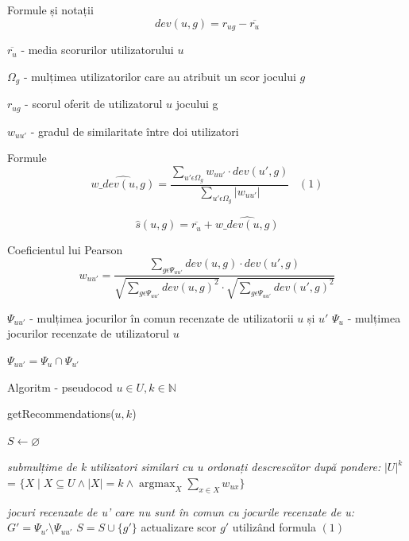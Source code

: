 \documentclass{beamer}
\DeclareMathOperator*{\argmax}{argmax}
\begin{document}
\begin{frame}{Formule și notații}
    \[ dev(u,g) = r_{ug} - \overline{r_{u}} \]
    
    \( \overline{r_{u}}\) - media scorurilor utilizatorului \( u \)
    
    \( \Omega_{g}\) - mulțimea utilizatorilor care au atribuit un scor jocului \( g \)
    
    \( r_{ug} \) - scorul oferit de utilizatorul \( u \) jocului g
    
    \( w_{uu'}\) - gradul de similaritate între doi utilizatori
    
\end{frame}

\begin{frame}{Formule}
    \[ \hat{w\_dev(u,g)} = \dfrac{ \sum\limits_{u' \epsilon \Omega_{g} } w_{uu'} \cdot dev(u', g) }{\sum\limits_{u' \epsilon \Omega_{g}} |w_{uu'}|} \;\;\; (1) \]
    
    \[  \hat{s}(u,g) = \overline{r_u} + \hat{w\_dev(u,g)} \]
\end{frame}

\begin{frame}{Coeficientul lui Pearson}
\[ w_{uu'} = \dfrac{ \sum\limits_{g \epsilon \Psi_{uu'} } dev(u, g) \cdot dev(u', g) }{
\sqrt{\sum\limits_{g \epsilon \Psi_{uu'} } dev(u, g)^2} \cdot \sqrt{\sum\limits_{g \epsilon \Psi_{uu'} } dev(u', g)^2} }\]

\( \Psi_{uu'}\) - mulțimea jocurilor în comun recenzate de utilizatorii \( u \) și \( u' \)
\( \Psi_{u}\) - mulțimea jocurilor recenzate de utilizatorul \( u \)

\( \Psi_{uu'} = \Psi_{u} \cap \Psi_{u'} \) 

    
\end{frame}

\begin{frame}[fragile]{Algoritm - pseudocod}
    \( u \in U, k \in \mathbb{N} \)
    
    getRecommendations(\(u, k \))
    \begin{algorithmic}
\State $S \gets \varnothing $

\State \textit{ submulțime de k utilizatori similari cu u ordonați descrescător după pondere:}
\State \( |U|^k \) = \( \{ X  \; | \; X \subseteq U \land |X| = k \land \argmax_{X} \sum_{x \in X} w_{ux}  \} \)

    \State \textit{jocuri recenzate de u' care nu sunt în comun cu jocurile recenzate de u:}
    \State \( G' = \Psi_{u'} \setminus \Psi_{uu'}  \)
        \State \( S = S \cup \{ g' \}\)
        \State actualizare scor \( g' \) utilizând formula \( (1) \)

    \EndFor

\EndFor

\end{algorithmic}
\end{frame}
\end{document}
